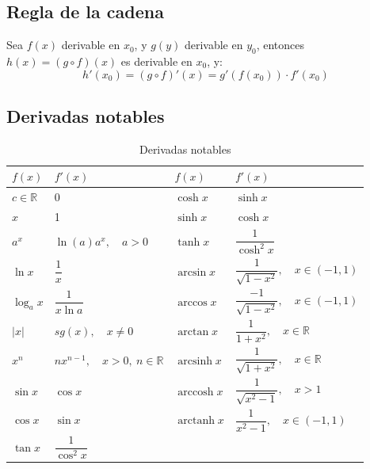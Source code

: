 \documentclass[11pt,titlepage]{article}
\DeclareMathOperator{\arcsinh}{arcsinh}
\DeclareMathOperator{\arccosh}{arccosh}
\DeclareMathOperator{\arctanh}{arctanh}
\begin{document}
\subsection{Regla de la cadena}
Sea $f(x)$ derivable en $x_0$, y $g(y)$ derivable en $y_0$, entonces $h(x) = (g \circ f)(x)$ es derivable en $x_0$, y:
\begin{equation}
	h'(x_0) = (g \circ f)'(x) = g'\left(f(x_0)\right) \cdot f'(x_0)
\end{equation}

\subsection{Derivadas notables}
\begin{table}[h!]
	\centering
	\setlength{\tabcolsep}{10pt} %
	\renewcommand{\arraystretch}{2.5} %
	\begin{tabularx}{\textwidth}{lX||lX}
		\toprule
		$f(x)$            & $f'(x)$                                  & $f(x)$       & $f'(x)$                                          \\
		\midrule
		$c\in \mathbb{R}$ & 0                                        & $\cosh x$    & $\sinh x$                                        \\
		$x$               & 1                                        & $\sinh x$    & $\cosh x$                                        \\
		$a^{x}$           & $\ln(a)a^{x}, \quad a>0$                 & $\tanh x$    & $\dfrac{1}{\cosh^2 x}$                           \\
		$\ln x$           & $\dfrac{1}{x}$                           & $\arcsin x$  & $\dfrac{1}{\sqrt{1-x^2}}, \quad x\in (-1,1)$     \\
		$\log_{a} x$      & $\dfrac{1}{x\ln a}$                      & $\arccos x$  & $\dfrac{-1}{\sqrt{1-x^2}}, \quad x\in (-1,1)$    \\
		$|x|$             & $sg(x), \quad x \neq 0$                  & $\arctan x$  & $\dfrac{1}{1+x^2}, \quad x\in \mathbb{R}$        \\
		$x^{n}$           & $nx^{n-1}, \quad x>0, \ n\in \mathbb{R}$ & $\arcsinh x$ & $\dfrac{1}{\sqrt{1+x^2}}, \quad x\in \mathbb{R}$ \\
		$\sin x$          & $\cos x$                                 & $\arccosh x$ & $\dfrac{1}{\sqrt{x^2 -1}}, \quad x>1$            \\
		$\cos x$          & $\sin x$                                 & $\arctanh x$ & $\dfrac{1}{x^2 -1}, \quad x\in (-1,1)$           \\
		$\tan x$          & $\dfrac{1}{\cos ^{2}x}$                  &              &                                                  \\
		\bottomrule
	\end{tabularx}
	\caption{Derivadas notables}
\end{table}
\end{document}
